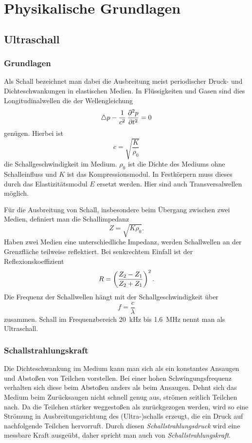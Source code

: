 \documentclass[
    11pt,
    ngerman
]{scrreprt}
\begin{document}
\chapter{Physikalische Grundlagen}

\section{Ultraschall}

\subsection{Grundlagen}

Als Schall bezeichnet man dabei die Ausbreitung meist periodischer Druck- und
Dichteschwankungen in elastischen Medien. In Flüssigkeiten und Gasen sind dies
Longitudinalwellen die der Wellengleichung
\[
    \laplace p - \frac1{c^2}\dpd[2]pt = 0
\]
genügen. Hierbei ist
\[
    c=\sqrt{\frac{K}{\rho_0}}
\]
die Schallgeschwindigkeit im Medium. $\rho_0$ ist die Dichte des Mediums ohne
Schalleinfluss und $K$ ist das Kompressionsmodul. In Festkörpern muss dieses
durch das Elastizitätsmodul $E$ ersetzt werden. Hier sind auch
Transversalwellen möglich.

Für die Ausbreitung von Schall, insbesondere beim Übergang zwischen zwei
Medien, definiert man die Schallimpedanz
\[
    Z=\sqrt{K\rho_0}.
\]
Haben zwei Medien eine unterschiedliche Impedanz, werden Schallwellen an der
Grenzfläche teilweise reflektiert. Bei senkrechtem Einfall ist der
Reflexionskoeffizient
\[
    R=\del{\frac{Z_2-Z_1}{Z_2+Z_1}}^2.
\]
Die Frequenz der Schallwellen hängt mit der Schallgeschwindigkeit über
\[
    f = \frac c\lambda
\]
zusammen. Schall im Frequenzbereich \SI{20}{\kilo\hertz} bis
\SI{1.6}{\mega\hertz} nennt man als Ultraschall.

\subsection{Schallstrahlungskraft}

Die Dichteschwankung im Medium kann man sich als ein konstantes Ansaugen und
Abstoßen von Teilchen vorstellen. Bei einer hohen Schwingungsfrequenz verhalten
sich diese beim Abstoßen anders als beim Ansaugen. Dehnt sich das Medium beim
Zurücksaugen nicht schnell genug aus, strömen seitlich Teilchen nach. Da die
Teilchen stärker weggestoßen als zurückgezogen werden, wird so eine Strömung in
Ausbreitungsrichtung des (Ultra-)schalls erzeugt, die ein Druck auf
nachfolgende Teilchen hervorruft. Durch diesen \emph{Schallstrahlungsdruck}
wird eine messbare Kraft ausgeübt, daher spricht man auch von
\emph{Schallstrahlungskraft}. 
\end{document}
